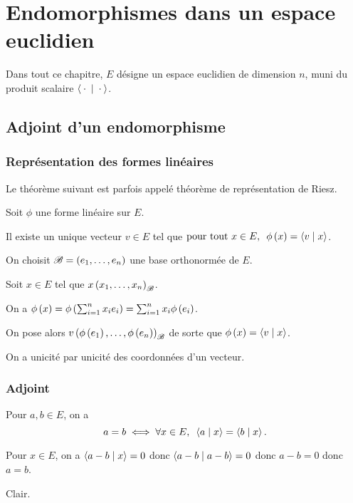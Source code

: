 \chapter{Endomorphismes dans un espace euclidien}

\minitoc

Dans tout ce chapitre, \(E\) désigne un espace euclidien de dimension \(n\), muni du produit scalaire \(\ps{}{}\).

\section{Adjoint d'un endomorphisme}

\subsection{Représentation des formes linéaires}

Le théorème suivant est parfois appelé théorème de représentation de Riesz.

\begin{prop}
Soit \(\phi\) une forme linéaire sur \(E\).

Il existe un unique vecteur \(v\in E\) tel que \(\quantifs{\tpt x\in E}\phi\paren{x}=\ps{v}{x}\).
\end{prop}

\begin{dem}
On choisit \(\mathscr{B}=\left(e_1,\dots,e_n\right)\) une base orthonormée de \(E\).

Soit \(x\in E\) tel que \(x\left(x_1,\dots,x_n\right)_{\mathscr{B}}\).

On a \(\phi\left(x\right)=\phi\left(\sum_{i=1}^nx_ie_i\right)=\sum_{i=1}^nx_i\phi\left(e_i\right)\).

On pose alors \(v\left(\phi\left(e_1\right),\dots,\phi\left(e_n\right)\right)_{\mathscr{B}}\) de sorte que \(\phi\paren{x}=\ps{v}{x}\).

On a unicité par unicité des coordonnées d'un vecteur.
\end{dem}

\subsection{Adjoint}

\begin{lem}
Pour \(a,b\in E\), on a \[a=b\ssi\quantifs{\forall x\in E}\ps{a}{x}=\ps{b}{x}.\]
\end{lem}

\begin{dem}
\imprec

Pour \(x\in E\), on a \(\ps{a-b}{x}=0\) donc \(\ps{a-b}{a-b}=0\) donc \(a-b=0\) donc \(a=b\).

\impdir

Clair.
\end{dem}

